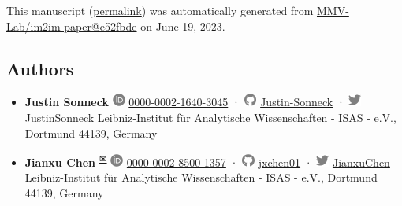 This manuscript
(\href{https://MMV-Lab.github.io/im2im-paper/v/e52fbde2994a307c76a8d2ec15346bfec89f46a9/}{permalink})
was automatically generated
from \href{https://github.com/MMV-Lab/im2im-paper/tree/e52fbde2994a307c76a8d2ec15346bfec89f46a9}{MMV-Lab/im2im-paper@e52fbde}
on June 19, 2023.

\hypertarget{authors}{%
\subsection{Authors}\label{authors}}

\begin{itemize}
\item
  \textbf{Justin Sonneck}
  \includegraphics[width=0.16667in,height=0.16667in]{images/orcid.svg}
  \href{https://orcid.org/0000-0002-1640-3045}{0000-0002-1640-3045}
  · \includegraphics[width=0.16667in,height=0.16667in]{images/github.svg}
  \href{https://github.com/Justin-Sonneck}{Justin-Sonneck}
  · \includegraphics[width=0.16667in,height=0.16667in]{images/twitter.svg}
  \href{https://twitter.com/JustinSonneck}{JustinSonneck}
  Leibniz-Institut für Analytische Wissenschaften - ISAS - e.V., Dortmund 44139, Germany
\item
  \textbf{Jianxu Chen}
  \textsuperscript{\protect\hyperlink{correspondence}{✉}}
  \includegraphics[width=0.16667in,height=0.16667in]{images/orcid.svg}
  \href{https://orcid.org/0000-0002-8500-1357}{0000-0002-8500-1357}
  · \includegraphics[width=0.16667in,height=0.16667in]{images/github.svg}
  \href{https://github.com/jxchen01}{jxchen01}
  · \includegraphics[width=0.16667in,height=0.16667in]{images/twitter.svg}
  \href{https://twitter.com/JianxuChen}{JianxuChen}
  Leibniz-Institut für Analytische Wissenschaften - ISAS - e.V., Dortmund 44139, Germany
\end{itemize}

